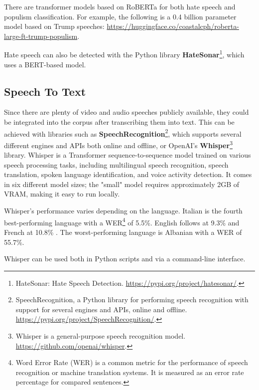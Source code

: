 There are transformer models based on RoBERTa for both hate speech and populism classification. For example, the following is a 0.4 billion parameter model based on Trump speeches: \url{https://huggingface.co/coastalcph/roberta-large-ft-trump-populism}.

Hate speech can also be detected with the Python library \textbf{HateSonar}\footnote{HateSonar: Hate Speech Detection. \url{https://pypi.org/project/hatesonar/}.}, which uses a BERT-based model.

\subsection{Speech To Text}

Since there are plenty of video and audio speeches publicly available, they could be integrated into the corpus after transcribing them into text. This can be achieved with libraries such as \textbf{SpeechRecognition}\footnote{SpeechRecognition, a Python library for performing speech recognition with support for several engines and APIs, online and offline. \url{https://pypi.org/project/SpeechRecognition/}.}, which supports several different engines and APIs both online and offline, or OpenAI's \textbf{Whisper}\footnote{Whisper is a general-purpose speech recognition model. \url{https://github.com/openai/whisper}.} library. Whisper is a Transformer sequence-to-sequence model trained on various speech processing tasks, including multilingual speech recognition, speech translation, spoken language identification, and voice activity detection. It comes in six different model sizes; the "small" model requires approximately 2GB of VRAM, making it easy to run locally.

Whisper's performance varies depending on the language. Italian is the fourth best-performing language with a WER\footnote{Word Error Rate (WER) is a common metric for the performance of speech recognition or machine translation systems. It is measured as an error rate percentage for compared sentences.} of 5.5\%. English follows at 9.3\% and French at 10.8\% \cite{radford_robust_2022}. The worst-performing language is Albanian with a WER of 55.7\%.

Whisper can be used both in Python scripts and via a command-line interface.